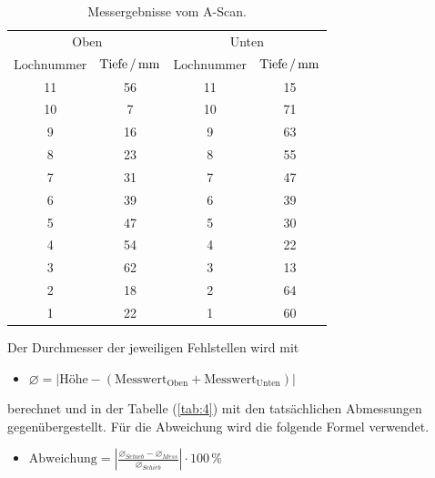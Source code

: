\begin{table}[H]
  \centering
  \caption{Messergebnisse vom A-Scan.}
  \label{tab:3}
  \begin{tabular}{c c c c}
    \toprule
    \multicolumn{2}{c}{Oben} & \multicolumn{2}{c}{Unten} \\
    \cmidrule(lr){1-2}\cmidrule(lr){3-4}
    $\text{Lochnummer}$ & $\text{Tiefe} \,/\, \si[per-mode=fraction]{\milli\meter}$ & $\text{Lochnummer}$ & $\text{Tiefe} \,/\, \si[per-mode=fraction]{\milli\meter}$\\
    \midrule
    11  & 56 & 11 & 15\\
    10  & 7  & 10 & 71\\
    9   & 16 & 9 & 63\\
    8   & 23 & 8 & 55\\
    7   & 31 & 7 & 47\\
    6   & 39 & 6 & 39\\
    5   & 47 & 5 & 30\\
    4   & 54 & 4 & 22\\
    3   & 62 & 3 & 13\\
    2   & 18 & 2 & 64\\
    1   & 22 & 1 & 60\\
  \bottomrule
  \end{tabular}
\end{table}

Der Durchmesser der jeweiligen Fehlstellen wird mit
\begin{itemize}
  \item $\diameter = |\text{Höhe} - (\text{Messwert}_{\text{Oben}} + \text{Messwert}_{\text{Unten}} )|$
\end{itemize}
berechnet und in der Tabelle (\ref{tab:4}) mit den tatsächlichen Abmessungen gegenübergestellt.
Für die Abweichung wird die folgende Formel verwendet.
\begin{itemize}
  \item $\text{Abweichung} = |\frac{\diameter_{Schieb} - \diameter_{Mess}}{\diameter_{Schieb}}| \cdot 100 \, \%$
\end{itemize}

